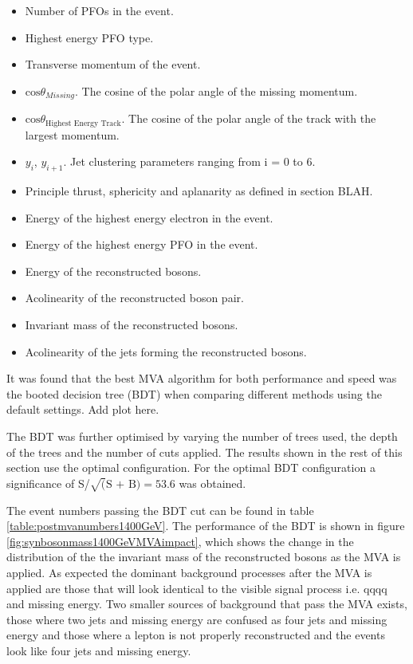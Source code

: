 \begin{itemize}
\item Number of PFOs in the event.
\item Highest energy PFO type.
\item Transverse momentum of the event.
\item $\text{cos}\theta_{Missing}$.  The cosine of the polar angle of the missing momentum.
\item $\text{cos}\theta_{\text{Highest Energy Track}}$.  The cosine of the polar angle of the track with the largest momentum.
\item $y_{i}$, $y_{i+1}$. Jet clustering parameters ranging from i = 0 to 6.
\item Principle thrust, sphericity and aplanarity as defined in section BLAH.
\item Energy of the highest energy electron in the event.
\item Energy of the highest energy PFO in the event.
\item Energy of the reconstructed bosons.
\item Acolinearity of the reconstructed boson pair.
\item Invariant mass of the reconstructed bosons.
\item Acolinearity of the jets forming the reconstructed bosons. 
\end{itemize}

It was found that the best MVA algorithm for both performance and speed was the booted decision tree (BDT) when comparing different methods using the default settings.  Add plot here.

The BDT was further optimised by varying the number of trees used, the depth of the trees and the number of cuts applied.  The results shown in the rest of this section use the optimal configuration.  For the optimal BDT configuration a significance of S/$\sqrt(\text{S + B}) = 53.6$ was obtained.  

The event numbers passing the BDT cut can be found in table \ref{table:postmvanumbers1400GeV}.  The performance of the BDT is shown in figure \ref{fig:synbosonmass1400GeVMVAimpact}, which shows the change in the distribution of the the invariant mass of the reconstructed bosons as the MVA is applied. As expected the dominant background processes after the MVA is applied are those that will look identical to the visible signal process i.e. qqqq and missing energy.  Two smaller sources of background that pass the MVA exists, those where two jets and missing energy are confused as four jets and missing energy and those where a lepton is not properly reconstructed and the events look like four jets and missing energy.  

